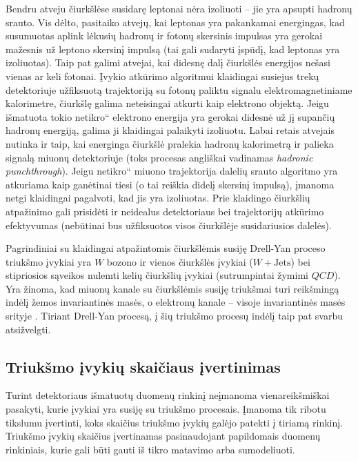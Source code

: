 \documentclass[a4paper, 12pt, oneside]{article}
\newcommand{\WJets}{W\! +\!\mathrm{Jets}}
\newcommand{\ltq}[1]{{\quotedblbase{}#1\textquotedblleft{}}}
\newcommand{\QCD}{QC\! D}
\newlength\q
\begin{document}
Bendru atveju čiurkšlėse susidarę leptonai nėra izoliuoti -- jie yra apsupti hadronų srauto.
Vis dėlto, pasitaiko atvejų, kai leptonas yra pakankamai energingas, kad susumuotas aplink lėkusių hadronų ir fotonų
skersinis impulsas yra gerokai mažesnis už leptono skersinį impulsą (tai gali sudaryti įspūdį, kad leptonas yra izoliuotas).
Taip pat galimi atvejai, kai didesnę dalį čiurkšlės energijos nešasi vienas ar keli fotonai.
Įvykio atkūrimo algoritmui klaidingai susiejus trekų detektoriuje užfiksuotą trajektoriją su fotonų paliktu signalu
elektromagnetiniame kalorimetre, čiurkšlę galima neteisingai atkurti kaip elektrono objektą.
Jeigu išmatuota tokio \ltq{netikro} elektrono energija yra gerokai didesnė už jį supančių hadronų energiją, galima ji
klaidingai palaikyti izoliuotu.
Labai retais atvejais nutinka ir taip, kai energinga čiurkšlė pralekia hadronų kalorimetrą ir palieka signalą miuonų
detektoriuje (toks procesas angliškai vadinamas \textit{hadronic punchthrough}).
Jeigu \ltq{netikro} miuono trajektorija dalelių srauto algoritmo yra atkuriama kaip ganėtinai tiesi (o tai reiškia
didelį skersinį impulsą), įmanoma netgi klaidingai pagalvoti, kad jis yra izoliuotas.
Prie klaidingo čiurkšlių atpažinimo gali prisidėti ir neidealus detektoriaus bei trajektorijų atkūrimo efektyvumas
(nebūtinai bus užfiksuotos visos čiurkšlėje susidariusios dalelės).

Pagrindiniai su klaidingai atpažintomis čiurkšlėmis susiję Drell-Yan proceso triukšmo įvykiai yra $W$ bozono ir vienos čiurkšlės
įvykiai ($\WJets$) bei stipriosios sąveikos nulemti kelių čiurkšlių įvykiai (sutrumpintai žymimi $\QCD$).
Yra žinoma, kad miuonų kanale su čiurkšlėmis susiję triukšmai turi reikšmingą indėlį žemos invariantinės masės,
o elektronų kanale -- visoje invariantinės masės srityje \cite{DY_CMS2011, DY_CMS2013, DY_CMS2015, DY_CMS2019}.
Tiriant Drell-Yan procesą, į šių triukšmo procesų indėlį taip pat svarbu atsižvelgti.

\subsection{Triukšmo įvykių skaičiaus įvertinimas}
Turint detektoriaus išmatuotų duomenų rinkinį neįmanoma vienareikšmiškai pasakyti, kurie įvykiai yra susiję su triukšmo
procesais.
Įmanoma tik ribotu tikslumu įvertinti, koks skaičius triukšmo įvykių galėjo patekti į tiriamą rinkinį.
Triukšmo įvykių skaičius įvertinamas pasinaudojant papildomais duomenų rinkiniais, kurie gali būti gauti iš tikro matavimo
arba sumodeliuoti.
\end{document}
